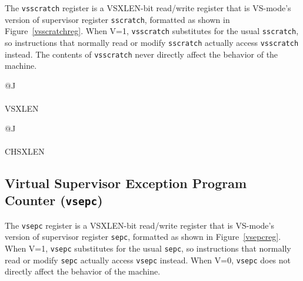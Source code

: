 The {\tt vsscratch} register is a VSXLEN-bit read/write register that is
VS-mode's version of supervisor register {\tt sscratch}, formatted as
shown in Figure~\ref{vsscratchreg}.
When V=1, {\tt vsscratch} substitutes for the usual {\tt sscratch}, so
instructions that normally read or modify {\tt sscratch} actually access
{\tt vsscratch} instead.
The contents of {\tt vsscratch} never directly affect the behavior of
the machine.

\begin{figure*}[h!]
{\footnotesize
\begin{center}
\begin{tabular}{@{}J}
 \\
\hline
{} \\
\hline
VSXLEN \\
\end{tabular}
\end{center}
}
\vspace{-0.1in}
\caption{Virtual supervisor scratch register ({\tt vsscratch}).}
\label{vsscratchreg}
\end{figure*}


\begin{figure*}[h!]
{\footnotesize
\begin{center}
\begin{tabular}{@{}J}
 \\
\hline
{} \\
\hline
CHSXLEN \\
\end{tabular}
\end{center}
}
\vspace{-0.1in}
\caption{Confidential hypervisor-extended supervisor scratch register ({\tt chsscratch}).}
\label{chsscratchreg}
\end{figure*}

\subsection{Virtual Supervisor Exception Program Counter ({\tt vsepc})}

The {\tt vsepc} register is a VSXLEN-bit read/write register that is
VS-mode's version of supervisor register {\tt sepc}, formatted as shown
in Figure~\ref{vsepcreg}.
When V=1, {\tt vsepc} substitutes for the usual {\tt sepc}, so
instructions that normally read or modify {\tt sepc} actually access
{\tt vsepc} instead.
When V=0, {\tt vsepc} does not directly affect the behavior of the
machine.

